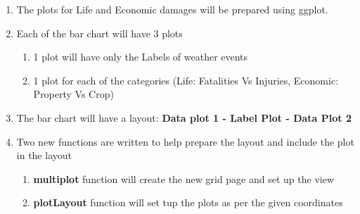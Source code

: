 \documentclass[]{article}
\providecommand{\tightlist}{%
  \setlength{\itemsep}{0pt}\setlength{\parskip}{0pt}}
\begin{document}
\begin{enumerate}
\def\labelenumi{\arabic{enumi})}
\tightlist
\item
  The plots for Life and Economic damages will be prepared using
  ggplot.\\
\item
  Each of the bar chart will have 3 plots

  \begin{enumerate}
  \def\labelenumii{\alph{enumii})}
  \tightlist
  \item
    1 plot will have only the Labels of weather events\\
  \item
    1 plot for each of the categories (Life: Fatalities Vs Injuries,
    Economic: Property Vs Crop)\\
  \end{enumerate}
\item
  The bar chart will have a layout: \textbf{Data plot 1 - Label Plot -
  Data Plot 2}\\
\item
  Two new functions are written to help prepare the layout and include
  the plot in the layout

  \begin{enumerate}
  \def\labelenumii{\alph{enumii})}
  \tightlist
  \item
    \textbf{multiplot} function will create the new grid page and set up
    the view\\
  \item
    \textbf{plotLayout} function will set tup the plots as per the given
    coordinates
  \end{enumerate}
\end{enumerate}
\end{document}

